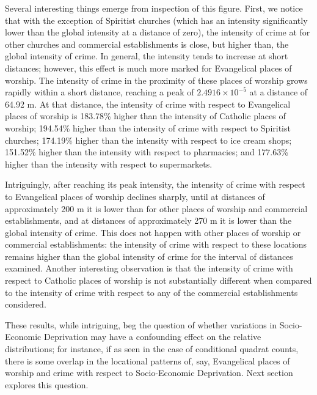 \documentclass[smallextended]{svjour3}       %
\begin{document}
Several interesting things emerge from inspection of this figure. First,
we notice that with the exception of Spiritist churches (which has an
intensity significantly lower than the global intensity at a distance of
zero), the intensity of crime at for other churches and commercial
establishments is close, but higher than, the global intensity of crime.
In general, the intensity tends to increase at short distances; however,
this effect is much more marked for Evangelical places of worship. The
intensity of crime in the proximity of these places of worship grows
rapidly within a short distance, reaching a peak of
\ensuremath{2.4916\times 10^{-5}} at a distance of 64.92 m. At that
distance, the intensity of crime with respect to Evangelical places of
worship is 183.78\% higher than the intensity of Catholic places of
worship; 194.54\% higher than the intensity of crime with respect to
Spiritist churches; 174.19\% higher than the intensity with respect to
ice cream shops; 151.52\% higher than the intensity with respect to
pharmacies; and 177.63\% higher than the intensity with respect to
supermarkets.

Intriguingly, after reaching its peak intensity, the intensity of crime
with respect to Evangelical places of worship declines sharply, until at
distances of approximately 200 m it is lower than for other places of
worship and commercial establishments, and at distances of approximately
270 m it is lower than the global intensity of crime. This does not
happen with other places of worship or commercial establishments: the
intensity of crime with respect to these locations remains higher than
the global intensity of crime for the interval of distances examined.
Another interesting observation is that the intensity of crime with
respect to Catholic places of worship is not substantially different
when compared to the intensity of crime with respect to any of the
commercial establishments considered.

These results, while intriguing, beg the question of whether variations
in Socio-Economic Deprivation may have a confounding effect on the
relative distributions; for instance, if as seen in the case of
conditional quadrat counts, there is some overlap in the locational
patterns of, say, Evangelical places of worship and crime with respect
to Socio-Economic Deprivation. Next section explores this question.
\end{document}
